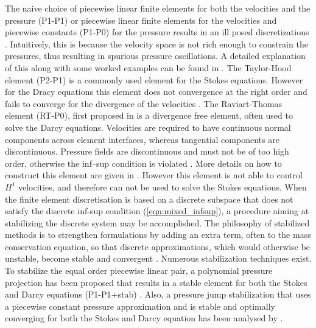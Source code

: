 %
The naive choice of piecewise linear finite elements for both the velocities and the pressure (P1-P1) or piecewise linear finite elements for the velocities and piecewise constants (P1-P0) for the pressure results in an ill posed discretizations \citep{burman2007unified}. Intuitively, this is because the velocity space is not rich enough to constrain the pressures, thus resulting in spurious pressure oscillations. A detailed explanation of this along with some worked examples can be found in \citet[section 5.3]{elman2005finite}. The Taylor-Hood element (P2-P1) is a commonly used element for the Stokes equations. However for the Dracy equations this element does not convergence at the right order and fails to converge for the divergence of the velocities
\citep{burman2007unified}. The Raviart-Thomas element (RT-P0), first proposed in \citet{raviart1977mixed} is a divergence free element, often used to solve the Darcy equations. Velocities are required to have continuous normal components
across element interfaces, whereas tangential components are discontinuous. Pressure fields are discontinuous and must not be of too high order, otherwise the inf–sup condition is violated \citep{masud2002stabilized}. More details on how to construct this element are given in \citet{quarteroni2008numerical}. However this element is not able to control $H^{1}$ velocities, and therefore can not be used to solve the Stokes equations.  
%
%
%
When the finite element discretisation is based on a discrete subspace that does not satisfy the discrete inf-sup condition (\ref{eqn:mixed_infsup}), a procedure aiming at stabilizing the discrete system may be accomplished. The philosophy of stabilized methods is to
strengthen formulations by adding an extra term, often to the mass conservation equation, so that discrete approximations, which would otherwise be
unstable, become stable and convergent \citep{masud2002stabilized}. 
%
Numerous stabilization techniques exist. To stabilize the equal order piecewise linear pair, a  polynomial pressure projection has been proposed that results in a stable element for both the Stokes and Darcy equations (P1-P1+stab) \citet{bochev2006computational}. Also, a pressure jump stabilization that uses a  piecewise constant pressure approximation and is stable and optimally converging for both the Stokes and Darcy equation has been analysed by \citet{burman2007unified}.

